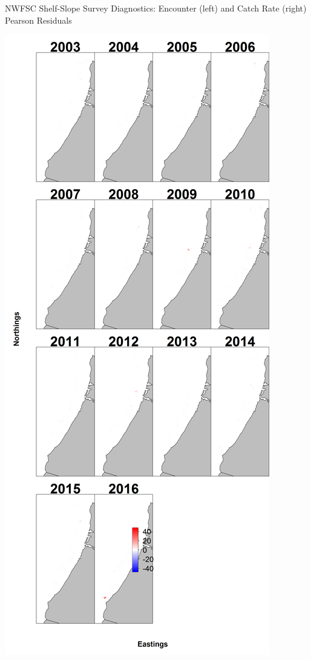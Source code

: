 \documentclass[pdf]{beamer}\usepackage[]{graphicx}\usepackage[]{color}
\begin{document}
\begin{frame}{NWFSC Shelf-Slope Survey Diagnostics: Encounter (left) and Catch Rate (right) Pearson Residuals}
\begin{center}
  \includegraphics[scale = 0.12]{figures/Combo_maps--catchrate_pearson_resid.png}
  \end{center}
\end{frame}
\end{document}
